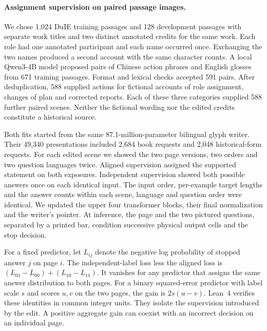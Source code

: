\paragraph{Assignment supervision on paired passage images.}
We chose 1,024 DuIE training passages and 128 development passages with separate work titles and two distinct annotated credits for the same work. Each role had one annotated participant and each name occurred once. Exchanging the two names produced a second account with the same character counts. A local Qwen3-4B model proposed pairs of Chinese action phrases and English glosses from 671 training passages. Format and lexical checks accepted 591 pairs. After deduplication, 588 supplied actions for fictional accounts of role assignment, changes of plan and corrected reports. Each of these three categories supplied 588 further paired scenes. Neither the fictional wording nor the edited credits constitute a historical source.

Both fits started from the same 87.1-million-parameter bilingual glyph writer. Their 49,340 presentations included 2,684 book requests and 2,048 historical-form requests. For each edited scene we showed the two page versions, two orders and two question languages twice. Aligned supervision assigned the supported statement on both exposures. Independent supervision showed both possible answers once on each identical input. The input order, per-example target lengths and the answer counts within each scene, language and question order were identical. We updated the upper four transformer blocks, their final normalization and the writer's pointer. At inference, the page and the two pictured questions, separated by a printed bar, condition successive physical output cells and the stop decision.

For a fixed predictor, let $L_{ij}$ denote the negative log probability of stopped answer $j$ on page $i$. The independent-label loss less the aligned loss is $(L_{01}-L_{00})+(L_{10}-L_{11})$. It vanishes for any predictor that assigns the same answer distribution to both pages. For a binary squared-error predictor with label scale $s$ and scores $u,v$ on the two pages, the gain is $2s(u-v)$. Lean~4 verifies these identities in common integer units. They isolate the supervision introduced by the edit. A positive aggregate gain can coexist with an incorrect decision on an individual page.

